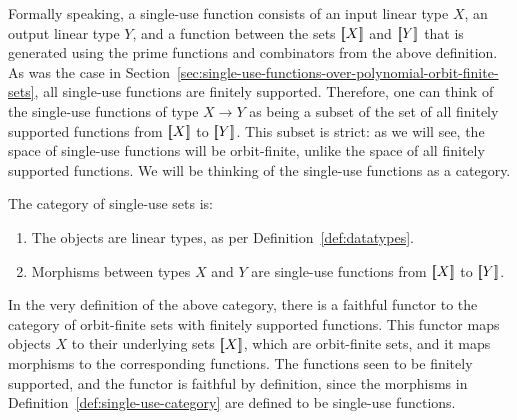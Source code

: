 \documentclass[10pt,a4paper]{amsart}
\numberwithin{equation}{section}
\theoremstyle{plain}
\newcommand{\sem}[1]{[{\kern-0.45ex}[#1]{\kern-0.45ex}]}
\newcommand{\atoms}{\mathbb A}
\begin{document}
   


Formally speaking, a single-use function consists of an input linear type $X$, an output linear type $Y$, and a function between the sets $\sem X$ and $\sem Y$ that is generated using the prime functions and combinators from the above definition.  As was the case in Section~\ref{sec:single-use-functions-over-polynomial-orbit-finite-sets}, all single-use functions are  finitely supported.  Therefore, one can think of the single-use functions of type $X \to Y$ as being a subset of the set of all finitely supported functions from $\sem X$ to $\sem Y$. This subset is strict: as we will see, the space of single-use functions will be orbit-finite, unlike the space of all finitely supported functions. We will be thinking of the single-use functions as a category.




\begin{definition}\label{def:single-use-category}
    The category of single-use sets is:
    \begin{enumerate}
        \item The objects are linear types, as per Definition~\ref{def:datatypes}.
        \item Morphisms between types $X$ and $Y$ are single-use functions from $\sem X$ to $\sem Y$.
    \end{enumerate}
\end{definition}

In the very definition of the above category, there is a faithful functor to the category of  orbit-finite sets with finitely supported functions. This functor maps objects $X$ to their underlying sets $\sem X$, which are orbit-finite sets, and it maps morphisms to the corresponding functions. The functions seen to be finitely supported, and the functor is faithful  by definition, since the morphisms in Definition~\ref{def:single-use-category} are defined to be single-use functions. 



\end{document}
